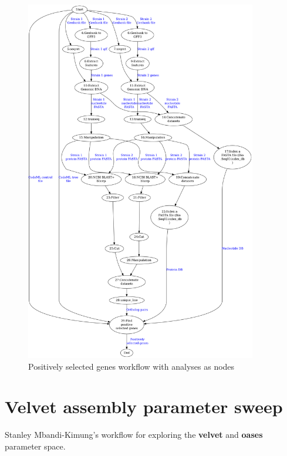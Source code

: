 \documentclass[a4paper,10pt]{scrreprt}
\begin{document}
\begin{figure}[h!]
\centering
\includegraphics[width=0.9\textwidth]{images/positive_selection_workflow_analyses_graph.png}
\caption{Positively selected genes workflow with analyses as nodes}
\label{fig:positive_selection_workflow_analyses_graph}
\end{figure}

\chapter{Velvet assembly parameter sweep}

\label{sec:velvet_assembly_parameter_walk}

Stanley Mbandi-Kimung's workflow for exploring the \textbf{velvet} and \textbf{oases} parameter space.


\end{document}
